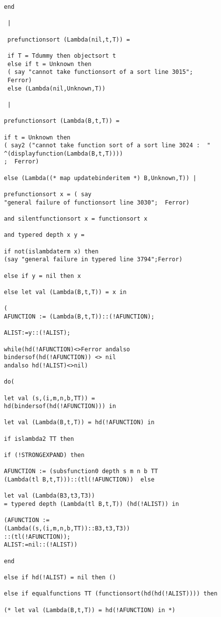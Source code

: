 \documentclass[12pt]{article}
\begin{document}
\begin{verbatim}
end

 |
 
 prefunctionsort (Lambda(nil,t,T)) =
 
 if T = Tdummy then objectsort t
 else if t = Unknown then 
 ( say "cannot take functionsort of a sort line 3015"; 
 Ferror)
 else (Lambda(nil,Unknown,T))
 
 |

prefunctionsort (Lambda(B,t,T)) =

if t = Unknown then 
( say2 ("cannot take function sort of a sort line 3024 :  "
^(displayfunction(Lambda(B,t,T))))
;  Ferror)

else (Lambda((* map updatebinderitem *) B,Unknown,T)) |

prefunctionsort x = ( say 
"general failure of functionsort line 3030";  Ferror)

and silentfunctionsort x = functionsort x

and typered depth x y =

if not(islambdaterm x) then 
(say "general failure in typered line 3794";Ferror)

else if y = nil then x

else let val (Lambda(B,t,T)) = x in

(
AFUNCTION := (Lambda(B,t,T))::(!AFUNCTION);

ALIST:=y::(!ALIST);

while(hd(!AFUNCTION)<>Ferror andalso 
bindersof(hd(!AFUNCTION)) <> nil 
andalso hd(!ALIST)<>nil)

do(

let val (s,(i,m,n,b,TT)) = 
hd(bindersof(hd(!AFUNCTION))) in

let val (Lambda(B,t,T)) = hd(!AFUNCTION) in

if islambda2 TT then

if (!STRONGEXPAND) then 

AFUNCTION := (subsfunction0 depth s m n b TT 
(Lambda(tl B,t,T)))::(tl(!AFUNCTION))  else 

let val (Lambda(B3,t3,T3)) 
= typered depth (Lambda(tl B,t,T)) (hd(!ALIST)) in

(AFUNCTION := 
(Lambda((s,(i,m,n,b,TT))::B3,t3,T3))
::(tl(!AFUNCTION));
ALIST:=nil::(!ALIST))

end

else if hd(!ALIST) = nil then ()

else if equalfunctions TT (functionsort(hd(hd(!ALIST)))) then

(* let val (Lambda(B,t,T)) = hd(!AFUNCTION) in *)


\end{verbatim}
\end{document}
